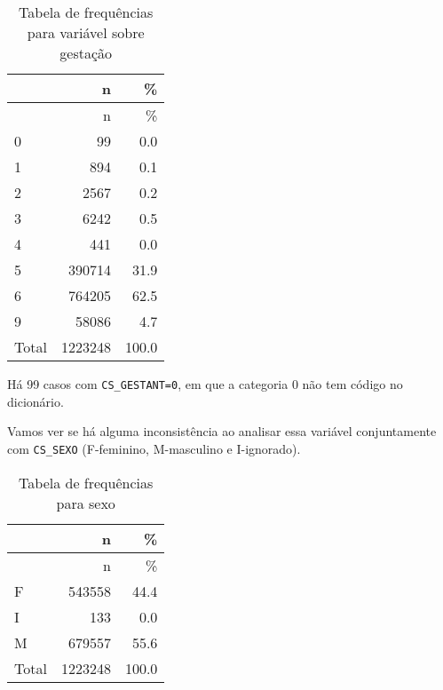\documentclass[
]{article}
\newenvironment{Shaded}{\begin{snugshade}}{\end{snugshade}}
\newcommand{\AttributeTok}[1]{\textcolor[rgb]{0.77,0.63,0.00}{#1}}
\newcommand{\CommentTok}[1]{\textcolor[rgb]{0.56,0.35,0.01}{\textit{#1}}}
\newcommand{\ConstantTok}[1]{\textcolor[rgb]{0.00,0.00,0.00}{#1}}
\newcommand{\DecValTok}[1]{\textcolor[rgb]{0.00,0.00,0.81}{#1}}
\newcommand{\FunctionTok}[1]{\textcolor[rgb]{0.00,0.00,0.00}{#1}}
\newcommand{\NormalTok}[1]{#1}
\newcommand{\SpecialCharTok}[1]{\textcolor[rgb]{0.00,0.00,0.00}{#1}}
\newcommand{\StringTok}[1]{\textcolor[rgb]{0.31,0.60,0.02}{#1}}
\begin{document}
\begin{longtable}[]{@{}lrr@{}}
\caption{Tabela de frequências para variável sobre
gestação}\tabularnewline
\toprule
& n & \% \\
\midrule
\endfirsthead
\toprule
& n & \% \\
\midrule
\endhead
0 & 99 & 0.0 \\
1 & 894 & 0.1 \\
2 & 2567 & 0.2 \\
3 & 6242 & 0.5 \\
4 & 441 & 0.0 \\
5 & 390714 & 31.9 \\
6 & 764205 & 62.5 \\
9 & 58086 & 4.7 \\
Total & 1223248 & 100.0 \\
\bottomrule
\end{longtable}

Há 99 casos com \texttt{CS\_GESTANT=0}, em que a categoria 0 não tem
código no dicionário.

Vamos ver se há alguma inconsistência ao analisar essa variável
conjuntamente com \texttt{CS\_SEXO} (F-feminino, M-masculino e
I-ignorado).

\begin{Shaded}
\end{Shaded}

\begin{longtable}[]{@{}lrr@{}}
\caption{Tabela de frequências para sexo}\tabularnewline
\toprule
& n & \% \\
\midrule
\endfirsthead
\toprule
& n & \% \\
\midrule
\endhead
F & 543558 & 44.4 \\
I & 133 & 0.0 \\
M & 679557 & 55.6 \\
Total & 1223248 & 100.0 \\
\bottomrule
\end{longtable}
\end{document}
